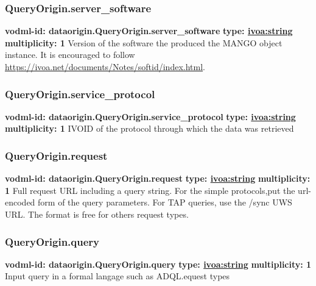     \subsubsection{QueryOrigin.server\_software}
    \textbf{vodml-id: dataorigin.QueryOrigin.server\_software} \newline
    \textbf{type: \hyperref[sect:ivoa]{ivoa:string}} \newline
    \textbf{multiplicity: 1} \newline
    Version of the software the produced the MANGO object instance. It is encouraged to follow \url{https://ivoa.net/documents/Notes/softid/index.html}.

    \subsubsection{QueryOrigin.service\_protocol}
    \textbf{vodml-id: dataorigin.QueryOrigin.service\_protocol} \newline
    \textbf{type: \hyperref[sect:ivoa]{ivoa:string}} \newline
    \textbf{multiplicity: 1} \newline
    IVOID \citep{2007ivoa.spec.0314P} of the protocol through which the data was retrieved

    \subsubsection{QueryOrigin.request}
    \textbf{vodml-id: dataorigin.QueryOrigin.request} \newline
    \textbf{type: \hyperref[sect:ivoa]{ivoa:string}} \newline
    \textbf{multiplicity: 1} \newline
    Full request URL including a query string. For the simple protocols,put the url-encoded form of the query parameters. For TAP queries, use the /sync UWS \citep{2016ivoa.spec.1024H} URL. The format is free for others request types.

    \subsubsection{QueryOrigin.query}
    \textbf{vodml-id: dataorigin.QueryOrigin.query} \newline
    \textbf{type: \hyperref[sect:ivoa]{ivoa:string}} \newline
    \textbf{multiplicity: 1} \newline
    Input query in a formal langage such as ADQL.equest types \citep{2023ivoa.spec.1215M}

